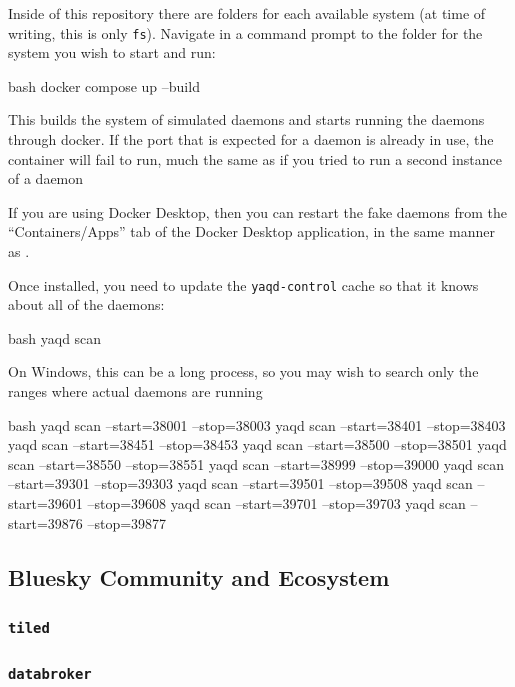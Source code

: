 Inside of this repository there are folders for each available system (at time of writing, this is only \texttt{fs}).
Navigate in a command prompt to the folder for the system you wish to start and run:

\begin{codefragment}{bash}
docker compose up --build
\end{codefragment}

This builds the system of simulated daemons and starts running the daemons through docker.
If the port that is expected for a \yaq daemon is already in use, the container will fail to run, much the same as if you tried to run a second instance of a \yaq daemon


If you are using Docker Desktop, then you can restart the fake daemons from the ``Containers/Apps'' tab of the Docker Desktop application, in the same manner as \biab.

Once installed, you need to update the \texttt{yaqd-control} cache so that it knows about all of the daemons:

\begin{codefragment}{bash}
yaqd scan
\end{codefragment}

On Windows, this can be a long process, so you may wish to search only the ranges where actual daemons are running

\begin{codefragment}{bash}
yaqd scan --start=38001 --stop=38003
yaqd scan --start=38401 --stop=38403
yaqd scan --start=38451 --stop=38453
yaqd scan --start=38500 --stop=38501
yaqd scan --start=38550 --stop=38551
yaqd scan --start=38999 --stop=39000
yaqd scan --start=39301 --stop=39303
yaqd scan --start=39501 --stop=39508
yaqd scan --start=39601 --stop=39608
yaqd scan --start=39701 --stop=39703
yaqd scan --start=39876 --stop=39877
\end{codefragment}

\subsection{Bluesky Community and Ecosystem}
\subsubsection{\texttt{tiled}}
\subsubsection{\texttt{databroker}}

\clearpage
